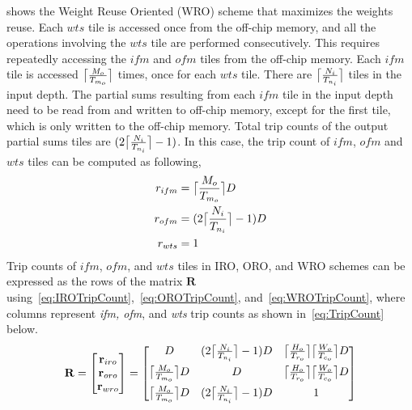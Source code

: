  shows the Weight Reuse Oriented (WRO) scheme that maximizes the weights reuse. Each $wts$ tile is accessed once from the off-chip memory, and all the operations involving the $wts$ tile are performed consecutively. This requires repeatedly accessing the $ifm$ and $ofm$ tiles from the off-chip memory. Each $ifm$ tile  is accessed $\ceil[\big]{\frac{M_o}{T_{m_o}}}$ times, once for each $wts$ tile. There are $\ceil[\big]{\frac{N_i}{T_{n_i}}}$ tiles in the input depth. The partial sums resulting from each $ifm$ tile in the input depth need to be read from and written to off-chip memory, except for the first tile, which is only written to the off-chip memory. Total trip counts of the output partial sums tiles are $(2\ceil[\big]{\frac{N_i}{T_{n_i}}}-1)$. In this case, the trip count of $ifm$, $ofm$ and $wts$ tiles can be computed as following,
\begin{align}\label{eq:WROTripCount}
	\begin{split}
		r_{ifm} &= \ceil[\big]{\frac{M_o}{T_{m_o}}}D\\
		r_{ofm}&= (2\ceil[\big]{\frac{N_i}{T_{n_i}}}-1)D \\
		r_{wts} &= 1
	\end{split}
\end{align}
Trip counts of $ifm$, $ofm$, and $wts$ tiles in IRO, ORO, and WRO schemes can be expressed as the rows of the matrix $\mathbf{R}$ using~\eqref{eq:IROTripCount},~\eqref{eq:OROTripCount}, and~\eqref{eq:WROTripCount}, where columns represent \textit{ifm, ofm}, and \textit{wts} trip counts as shown in~\eqref{eq:TripCount} below.
\begin{align}\label{eq:TripCount}
	\mathbf{R}=
	\begin{bmatrix}
		\mathbf{r}_{iro} \\  \mathbf{r}_{oro} \\ \mathbf{r}_{wro} \\
	\end{bmatrix}=
	\begin{bmatrix}
		D&(2\ceil[\big]{\frac{N_i}{T_{n_i}}}-1)D&\ceil[\big]{\frac{H_o}{T_{r_o}}}\ceil[\big]{\frac{W_o}{T_{c_o}}}D\\[6pt]
		\ceil[\big]{\frac{M_o}{T_{m_o}}}D&D&\ceil[\big]{\frac{H_o}{T_{r_o}}}\ceil[\big]{\frac{W_o}{T_{c_o}}} D\\[6pt]
		\ceil[\big]{\frac{M_o}{T_{m_o}}}D&(2\ceil[\big]{\frac{N_i}{T_{n_i}}}-1)D&1\\
	\end{bmatrix}
\end{align}
